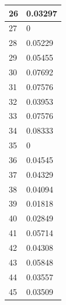 \begin{tabular}{|l||l|}
	26 & 0.03297 \\ \hline
	27 & 0 \\ \hline
	28 & 0.05229 \\ \hline
	29 & 0.05455 \\ \hline
	30 & 0.07692 \\ \hline
	31 & 0.07576 \\ \hline
	32 & 0.03953 \\ \hline
	33 & 0.07576 \\ \hline
	34 & 0.08333 \\ \hline
	35 & 0 \\ \hline
	36 & 0.04545 \\ \hline
	37 & 0.04329 \\ \hline
	38 & 0.04094 \\ \hline
	39 & 0.01818 \\ \hline
	40 & 0.02849 \\ \hline
	41 & 0.05714 \\ \hline
	42 & 0.04308 \\ \hline
	43 & 0.05848 \\ \hline
	44 & 0.03557 \\ \hline
	45 & 0.03509 \\ \hline
\end{tabular}
